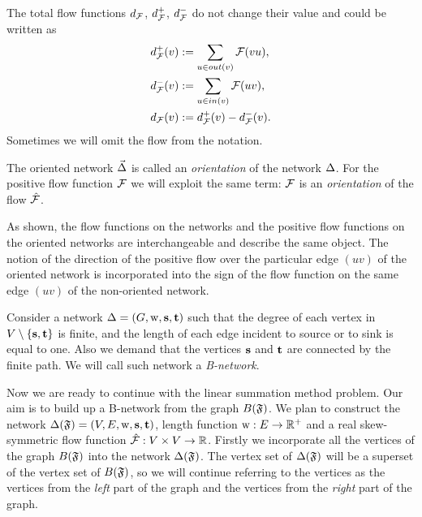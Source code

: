\documentclass[12pt]{article}
\begin{document}
    The total flow functions $d_{\mathcal{F}}$, $d^{+}_{\mathcal{F}}$, $d^{-}_{\mathcal{F}}$ do not change their value and could be written as
    \begin{align*}
      &d^{+}_{\mathcal{F}}(v) := \sum_{u \in out(v)} \mathcal{F}(vu),\\
      &d^{-}_{\mathcal{F}}(v) := \sum_{u \in in(v)} \mathcal{F}(uv),\\
      &d_{\mathcal{F}}(v) := d^{+}_{\mathcal{F}}(v) - d^{-}_{\mathcal{F}}(v).
    \end{align*}
    Sometimes we will omit the flow from the notation.
    \begin{definition}
      The oriented network $\vec{\Delta}$ is called an \emph{orientation} of the network $\Delta$.
      For the positive flow function $\mathcal{F}$ we will exploit the same term:
        $\mathcal{F}$ is an \emph{orientation} of the flow $\mathcal{\hat{F}}$.
    \end{definition}
    \begin{remark}
      As shown, the flow functions on the networks and the positive flow functions on the oriented networks
        are interchangeable and describe the same object.
      The notion of the direction of the positive flow over the particular edge $(uv)$ of the oriented network
        is incorporated into the sign of the flow function on the same edge $(uv)$ of the non-oriented network.
    \end{remark}
    \begin{definition}
      Consider a network $\Delta = (G, \mathrm{w}, \mathbf{s}, \mathbf{t})$ such that
        the degree of each vertex in $V \setminus \{\mathbf{s}, \mathbf{t}\} $ is finite,
        and the length of each edge incident to source or to sink is equal to one.
      Also we demand that the vertices $\mathbf{s}$ and $\mathbf{t}$ are connected by the finite path.
      We will call such network a \emph{B-network}.
    \end{definition}
    Now we are ready to continue with the linear summation method problem.
    Our aim is to build up a B-network from the graph $B(\mathfrak{F})$.
    We plan to construct the network $\Delta(\mathfrak{F}) = (V, E, \mathrm{w}, \mathbf{s}, \mathbf{t})$,
      length function $\mathrm{w}: E \to \mathbb{R}^{+}$ and a real skew-symmetric flow function $\mathcal{\hat{F}}: V \times V \to \mathbb{R}$.
    Firstly we incorporate all the vertices of the graph $B(\mathfrak{F})$ into the network $\Delta(\mathfrak{F})$.
    The vertex set of $\Delta(\mathfrak{F})$ will be a superset of the vertex set of $B(\mathfrak{F})$,
      so we will continue referring to the vertices as the vertices from
      the \emph{left} part of the graph and the vertices from the \emph{right} part of the graph.
\end{document}

